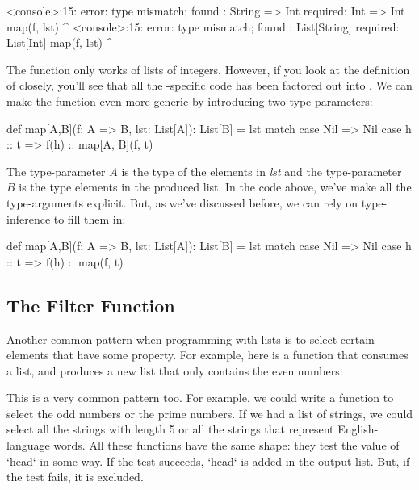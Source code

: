 \documentclass{book}
\begin{document}
\begin{console}
<console>:15: error: type mismatch;
 found   : String => Int
 required: Int => Int
         map(f, lst)
             ^
<console>:15: error: type mismatch;
 found   : List[String]
 required: List[Int]
         map(f, lst)
                  ^
\end{console}

The  function only works of lists of integers. However, if you
look at the definition of  closely, you'll see that all the
-specific code has been factored out into . We
can make the function even more generic by introducing two type-parameters:

\begin{scalacode}
def map[A,B](f: A => B, lst: List[A]): List[B] = lst match {
  case Nil => Nil
  case h :: t => f(h) :: map[A, B](f, t)
}
\end{scalacode}

The type-parameter $A$ is the type of the elements in
\emph{lst} and the type-parameter $B$ is the type elements in the produced list.
In the code above, we've make all the type-arguments explicit. But, as we've
discussed before, we can rely on type-inference to fill them in:

\begin{scalacode}
def map[A,B](f: A => B, lst: List[A]): List[B] = lst match {
  case Nil => Nil
  case h :: t => f(h) :: map(f, t)
}
\end{scalacode}

\subsection{The Filter Function}

Another common pattern when programming with lists is to select certain elements
that have some property. For example, here is a function that consumes a list,
and produces a new list that only contains the even numbers:


This is a very common pattern too. For example, we could write a function to
select the odd numbers or the prime numbers. If we had a list of strings, we
could select all the strings with length 5 or all the strings that represent
English-language words. All these functions have the same shape: they test
the value of `head` in some way. If the test succeeds, `head` is added in
the output list. But, if the test fails, it is excluded.
\end{document}
